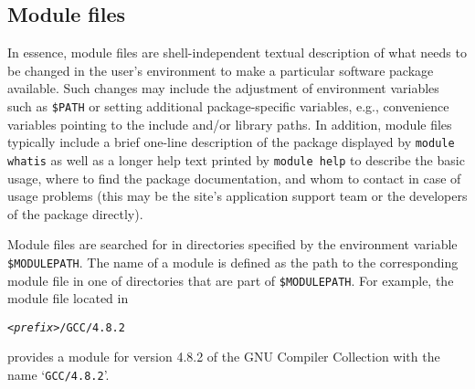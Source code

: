 
%
%

\subsection{Module files}
\label{sec:Module_files}

In essence, module files are shell-independent textual description of
what needs to be changed in the user's environment to make a
particular software package available. Such changes may include the
adjustment of environment variables such as \texttt{\$PATH} or setting
additional package-specific variables, e.g., convenience
variables pointing to the include and/or library paths.  In addition,
module files typically include a brief one-line description of the
package displayed by \texttt{module whatis} as well as a longer help
text printed by \texttt{module help} to describe the basic usage,
where to find the package documentation, and whom to contact in case
of usage problems (this may be the site's application support team or
the developers of the package directly).

Module files are searched for in directories specified by the
environment variable \texttt{\$MODULEPATH}. The name of a module is defined
as the path to the corresponding module file in one of directories that are
part of \texttt{\$MODULEPATH}. For example, the module file located in
{\small
\begin{alltt}
    <\emph{prefix}>/GCC/4.8.2
\end{alltt}
}
provides a module for version 4.8.2 of the GNU Compiler Collection with the
name `\texttt{GCC/4.8.2}'.

